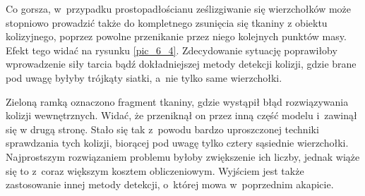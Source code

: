 		
		Co gorsza, w~przypadku prostopadłościanu ześlizgiwanie się wierzchołków może stopniowo prowadzić także do kompletnego zsunięcia się tkaniny z obiektu kolizyjnego, poprzez powolne przenikanie przez niego kolejnych punktów masy. Efekt tego widać na rysunku \ref{pic_6_4}. Zdecydowanie sytuację poprawiłoby wprowadzenie siły tarcia bądź dokładniejszej metody detekcji kolizji, gdzie brane pod uwagę byłyby trójkąty siatki, a~nie tylko same wierzchołki.
		
		Zieloną ramką oznaczono fragment tkaniny, gdzie wystąpił błąd rozwiązywania kolizji wewnętrznych. Widać, że przeniknął on przez inną część modelu i~zawinął się w drugą stronę. Stało się tak z~powodu bardzo uproszczonej techniki sprawdzania tych kolizji, biorącej pod uwagę tylko cztery sąsiednie wierzchołki. Najprostszym rozwiązaniem problemu byłoby zwiększenie ich liczby, jednak wiąże się to z~coraz większym kosztem obliczeniowym. Wyjściem jest także zastosowanie innej metody detekcji, o~której mowa w~poprzednim akapicie.
			
			
			
